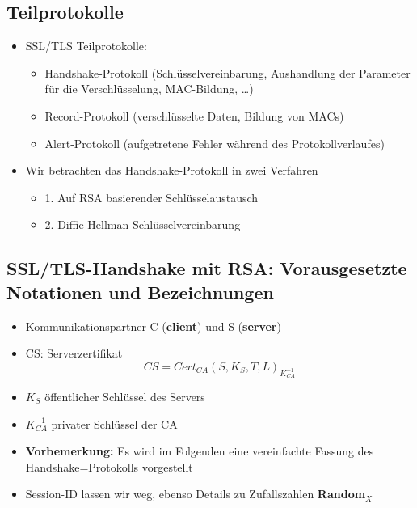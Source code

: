 \documentclass[openany]{book}
\begin{document}
\subsection{Teilprotokolle}

\begin{itemize}
    \item SSL/TLS Teilprotokolle:
    \begin{itemize}
        \item Handshake-Protokoll (Schlüsselvereinbarung, Aushandlung der Parameter für die Verschlüsselung, MAC-Bildung, \dots)
        \item Record-Protokoll (verschlüsselte Daten, Bildung von MACs)
        \item Alert-Protokoll (aufgetretene Fehler während des Protokollverlaufes)
    \end{itemize}
    \item Wir betrachten das Handshake-Protokoll in zwei Verfahren
    \begin{itemize}
        \item 1. Auf RSA basierender Schlüsselaustausch
        \item 2. Diffie-Hellman-Schlüsselvereinbarung
    \end{itemize}
\end{itemize}

\subsection{SSL/TLS-Handshake mit RSA: Vorausgesetzte Notationen und Bezeichnungen}

\begin{itemize}
    \item Kommunikationspartner C (\textbf{client}) und S (\textbf{server})
    \item CS: Serverzertifikat $$CS = Cert_{CA}(S,K_S,T,L)_{K_{CA}^{-1}}$$
    \item $K_S$ öffentlicher Schlüssel des Servers
    \item $K_{CA}^{-1}$ privater Schlüssel der CA \\
    \item \textbf{Vorbemerkung:} Es wird im Folgenden eine vereinfachte Fassung des Handshake=Protokolls vorgestellt
    \item Session-ID lassen wir weg, ebenso Details zu Zufallszahlen \textbf{Random$_{X}$}
\end{itemize}

\newpage
\end{document}
